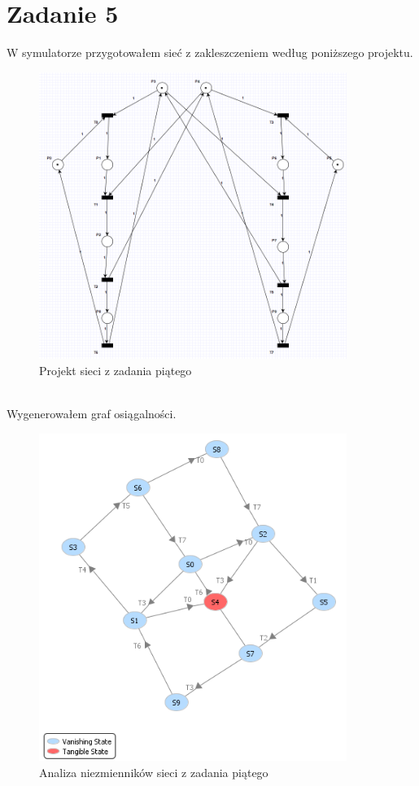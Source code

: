 \documentclass{article}
\begin{document}
    \section{Zadanie 5}
        W symulatorze przygotowałem sieć z zakleszczeniem według poniższego projektu.
        \begin{figure}[h!]
            \centering
            \includegraphics[width=10cm]{lab6/n5.png}
            \caption{Projekt sieci z zadania piątego}
        \end{figure}\\
        Wygenerowałem graf osiągalności. 
        \begin{figure}[h!]
            \centering
            \includegraphics[width=10cm]{lab6/n5_1.png}
            \caption{Analiza niezmienników sieci z zadania piątego}
        \end{figure}\\

        
\end{document}
